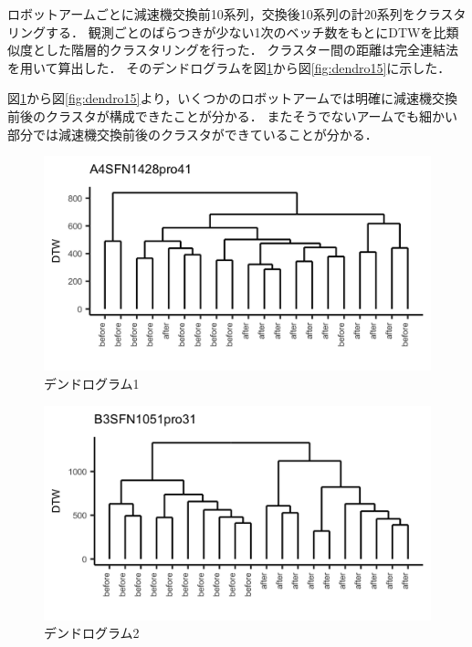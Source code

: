 \documentclass{jarticle}
\begin{document}
ロボットアームごとに減速機交換前10系列，交換後10系列の計20系列をクラスタリングする．
観測ごとのばらつきが少ない1次のベッチ数をもとにDTWを比類似度とした階層的クラスタリングを行った．
クラスター間の距離は完全連結法を用いて算出した．
そのデンドログラムを図\ref{fig:dendro1}から図\ref{fig:dendro15}に示した．

図\ref{fig:dendro1}から図\ref{fig:dendro15}より，いくつかのロボットアームでは明確に減速機交換前後のクラスタが構成できたことが分かる．
またそうでないアームでも細かい部分では減速機交換前後のクラスタができていることが分かる．

\begin{figure}[H]
	\begin{center}
		\includegraphics[width=15cm]{fig/dendro_1.png}
		\caption{デンドログラム1}
		\label{fig:dendro1}
	\end{center}
\end{figure}
\begin{figure}[H]
	\begin{center}
		\includegraphics[width=15cm]{fig/dendro_2.png}
		\caption{デンドログラム2}
		\label{fig:dendro2}
	\end{center}
\end{figure}
\end{document}
